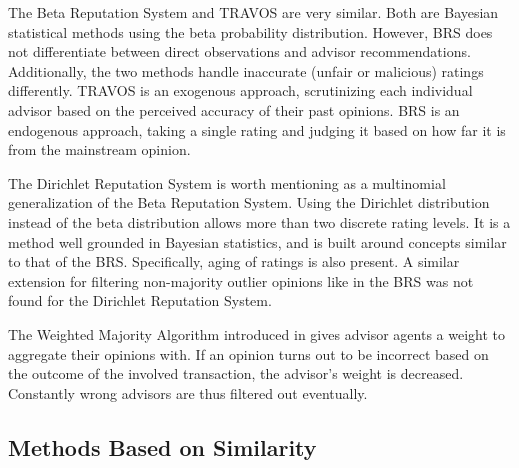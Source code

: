 \documentclass[%
    ]{\PathToTumTemplate/thesis/tum_thesis}
\begin{document}
The Beta Reputation System and TRAVOS are very similar.
Both are Bayesian statistical methods using the beta probability distribution.
However, BRS does not differentiate between direct observations and advisor recommendations.
Additionally, the two methods handle inaccurate (unfair or malicious) ratings differently.
TRAVOS is an exogenous approach, scrutinizing each individual advisor based on the perceived accuracy of their past opinions.
BRS is an endogenous approach, taking a single rating and judging it based on how far it is from the mainstream opinion.


The Dirichlet Reputation System is worth mentioning as a multinomial generalization of the Beta Reputation System\cite{josang_dirichlet_2007}.
Using the Dirichlet distribution instead of the beta distribution allows more than two discrete rating levels.
It is a method well grounded in Bayesian statistics, and is built around concepts similar to that of the BRS.
Specifically, aging of ratings is also present.
A similar extension for filtering non-majority outlier opinions like in the BRS was not found for the Dirichlet Reputation System.

The Weighted Majority Algorithm introduced in \cite{yu_detecting_2003} gives advisor agents a weight to aggregate their opinions with.
If an opinion turns out to be incorrect based on the outcome of the involved transaction, the advisor's weight is decreased.
Constantly wrong advisors are thus filtered out eventually.



\subsection{Methods Based on Similarity}
\end{document}

